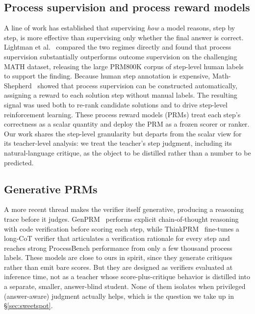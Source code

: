\documentclass{article}
\begin{document}
\subsection{Process supervision and process reward models}
A line of work has established that supervising \emph{how} a model reasons,
step by step, is more effective than supervising only whether the final
answer is correct. Lightman et al.~\cite{lightman2023verify} compared the two
regimes directly and found that process supervision substantially
outperforms outcome supervision on the challenging MATH dataset, releasing
the large PRM800K corpus of step-level human labels to support the finding.
Because human step annotation is expensive, Math-Shepherd~\cite{wang2023mathshepherd}
showed that process supervision can be constructed automatically, assigning
a reward to each solution step without manual labels. The resulting signal
was used both to re-rank candidate solutions and to drive step-level
reinforcement learning. These process reward models (PRMs) treat each step's
correctness as a scalar quantity and deploy the PRM as a frozen scorer or
ranker. Our work shares the step-level granularity but departs from the
scalar view for its teacher-level analysis: we treat the teacher's step
judgment, including its natural-language critique, as the object to be
distilled rather than a number to be predicted.

\subsection{Generative PRMs}
A more recent thread makes the verifier itself generative, producing a
reasoning trace before it judges. GenPRM~\cite{zhao2025genprm} performs
explicit chain-of-thought reasoning with code verification before scoring
each step, while ThinkPRM~\cite{khalifa2025thinkprm} fine-tunes a long-CoT
verifier that articulates a verification rationale for every step and
reaches strong ProcessBench performance from only a few thousand process
labels. These models are close to ours in spirit, since they generate
critiques rather than emit bare scores. But they are designed as verifiers
evaluated at inference time, not as a teacher whose score-plus-critique
behavior is distilled into a separate, smaller, answer-blind student. None of them
isolates when privileged (answer-aware) judgment actually helps, which is
the question we take up in \S\ref{sec:sweetspot}.
\end{document}
